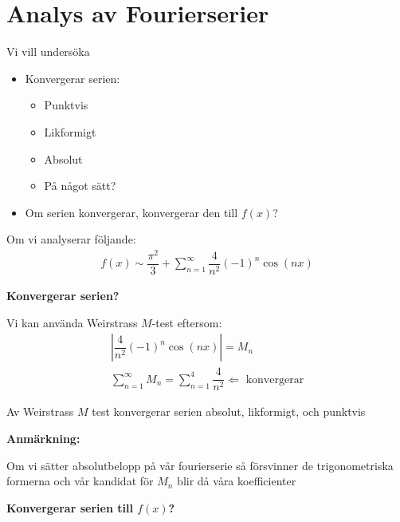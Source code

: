 \section{Analys av Fourierserier}\par
\noindent Vi vill undersöka\par
\begin{itemize}
  \item Konvergerar serien:\par
    \begin{itemize}
      \item Punktvis
      \item Likformigt
      \item Absolut
      \item På något sätt?
    \end{itemize}\par
  \item Om serien konvergerar, konvergerar den till $f(x)$? 
\end{itemize}
\par\bigskip
\noindent Om vi analyserar följande:
\begin{equation*}
  \begin{gathered}
    f(x)\sim \dfrac{\pi^2}{3}+\sum_{n=1}^{\infty}\dfrac{4}{n^2}(-1)^n\cos(nx)
  \end{gathered}
\end{equation*}
\par\bigskip
\noindent\textbf{Konvergerar serien?}\par
\noindent Vi kan använda Weirstrass $M$-test eftersom:
\begin{equation*}
  \begin{gathered}
    \left|\dfrac{4}{n^2}(-1)^n\cos(nx)\right| = M_n\\
    \sum_{n=1}^{\infty}M_n = \sum_{n=1}^{4}\dfrac{4}{n^2}\Leftarrow\text{ konvergerar}
  \end{gathered}
\end{equation*}
\par\bigskip
\noindent Av Weirstrass $M$ test konvergerar serien absolut, likformigt, och punktvis
\par\bigskip
\noindent\textbf{Anmärkning:}\par
\noindent Om vi sätter absolutbelopp på vår fourierserie så försvinner de trigonometriska formerna och vår kandidat för $M_n$ blir då våra koefficienter
\par\bigskip
\noindent\textbf{Konvergerar serien till $f(x)$?}\par
